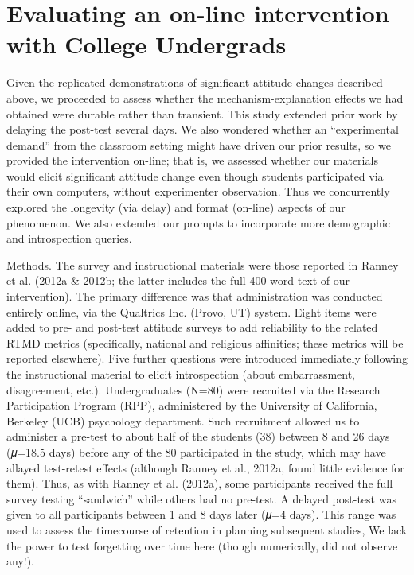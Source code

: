 \section{Evaluating an on-line intervention with College Undergrads}

Given the replicated demonstrations of significant attitude changes described
above, we proceeded to assess whether the mechanism-explanation effects we had
obtained were durable rather than transient. This study extended prior work by
delaying the post-test several days. We also wondered whether an ``experimental
demand'' from the classroom setting might have driven our prior results, so we
provided the intervention on-line; that is, we assessed whether our materials
would elicit significant attitude change even though students participated via
their own computers, without experimenter observation. Thus we concurrently
explored the longevity (via delay) and format (on-line) aspects of our
phenomenon. We also extended our prompts to incorporate more demographic and
introspection queries.

Methods. The survey and instructional materials were those reported in Ranney et
al. (2012a \& 2012b; the latter includes the full 400-word text of our
intervention). The primary difference was that administration was conducted
entirely online, via the Qualtrics Inc. (Provo, UT) system. Eight items were
added to pre- and post-test attitude surveys to add reliability to the related
RTMD metrics (specifically, national and religious affinities; these metrics
will be reported elsewhere). Five further questions were introduced immediately
following the instructional material to elicit introspection (about
embarrassment, disagreement, etc.).  Undergraduates (N=80) were recruited via
the Research Participation Program (RPP), administered by the University of
California, Berkeley (UCB) psychology department. Such recruitment allowed us to
administer a pre-test to about half of the students (38) between 8 and 26 days
(𝜇=18.5 days) before any of the 80 participated in the study, which may have
allayed test-retest effects (although Ranney et al., 2012a, found little
evidence for them). Thus, as with Ranney et al. (2012a), some participants
received the full survey testing ``sandwich'' while others had no pre-test. A
delayed post-test was given to all participants between 1 and 8 days later (𝜇=4
days). This range was used to assess the timecourse of retention in planning
subsequent studies, We lack the power to test forgetting over time here (though
numerically, did not observe any!).

